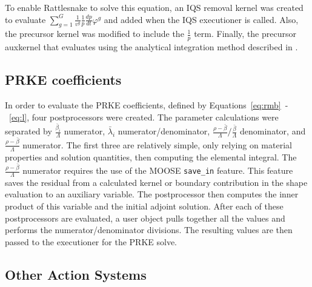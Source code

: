 To enable Rattlesnake to solve this equation, an IQS removal kernel was created to evaluate $\sum_{g=1}^G\frac{1}{v^g}\frac{1}{p}\frac{dp}{dt}\varphi^g$ and added when the IQS executioner is called.  Also, the precursor kernel was modified to include the $\frac{1}{p}$ term. Finally, the precursor auxkernel that evaluates  using the analytical integration method described in .

\subsection{PRKE coefficients}

In order to evaluate the PRKE coefficients, defined by Equations~\ref{eq:rmb}~-~\ref{eq:l}, four postprocessors were created.  The parameter calculations were separated by $\frac{\bar{\beta}_i}{\Lambda}$ numerator, $\bar{\lambda}_i$ numerator/denominator, $\frac{\rho-\bar{\beta}}{\Lambda}/\frac{\bar{\beta}}{\Lambda}$ denominator, and $\frac{\rho-\bar{\beta}}{\Lambda}$ numerator. The first three are relatively simple, only relying on material properties and solution quantities, then computing the elemental integral.  The $\frac{\rho-\bar{\beta}}{\Lambda}$ numerator requires the use of the MOOSE \texttt{save\_in} feature. This feature saves the residual from a calculated kernel or boundary contribution in the shape evaluation to an auxiliary variable.  The postprocessor then computes the inner product of this variable and the initial adjoint solution.  After each of these postprocessors are evaluated, a user object pulls together all the values and performs the numerator/denominator divisions.  The resulting values are then passed to the executioner for the PRKE solve.

\subsection{Other Action Systems}

